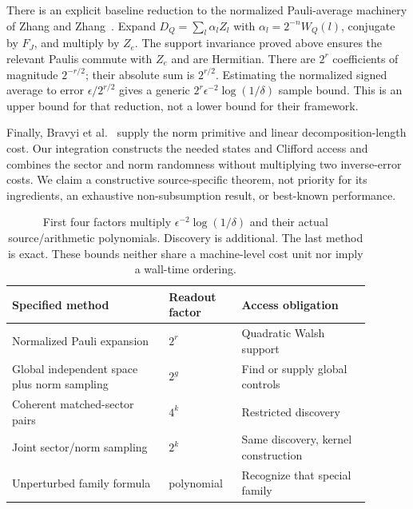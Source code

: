 \documentclass[11pt]{article}
\begin{document}
There is an explicit baseline reduction to the normalized Pauli-average machinery
of Zhang and Zhang~\cite[Section IV.1, Algorithm 1]{zhang2025}. Expand
$D_Q=\sum_l\alpha_l Z_l$ with $\alpha_l=2^{-n}W_Q(l)$, conjugate by $F_J$, and
multiply by $Z_e$. The support invariance proved above ensures the relevant Paulis
commute with $Z_e$ and are Hermitian. There are $2^r$ coefficients of magnitude
$2^{-r/2}$; their absolute sum is $2^{r/2}$. Estimating the normalized signed average
to error $\epsilon/2^{r/2}$ gives a generic $2^r\epsilon^{-2}\log(1/\delta)$ sample
bound. This is an upper bound for that reduction, not a lower bound for their framework.

Finally, Bravyi et al.~\cite[Section 4.3]{bravyi2019} supply the norm primitive and
linear decomposition-length cost. Our integration constructs the needed states and
Clifford access and combines the sector and norm randomness without multiplying two
inverse-error costs. We claim a constructive source-specific theorem, not priority
for its ingredients, an exhaustive non-subsumption result, or best-known performance.

\begin{table}[t]
\centering\small
\begin{tabular}{p{0.39\linewidth}p{0.18\linewidth}p{0.32\linewidth}}
\toprule
Specified method & Readout factor & Access obligation\\\midrule
Normalized Pauli expansion & $2^r$ & Quadratic Walsh support\\
Global independent space plus norm sampling & $2^g$ & Find or supply global controls\\
Coherent matched-sector pairs & $4^k$ & Restricted discovery\\
Joint sector/norm sampling & $2^k$ & Same discovery, kernel construction\\
Unperturbed family formula & polynomial & Recognize that special family\\
\bottomrule
\end{tabular}
\caption{First four factors multiply $\epsilon^{-2}\log(1/\delta)$ and their actual
source/arithmetic polynomials. Discovery is additional. The last method is exact.
These bounds neither share a machine-level cost unit nor imply a wall-time ordering.}
\label{tab:methods}
\end{table}
\end{document}

